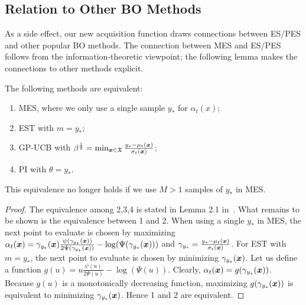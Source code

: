 \subsection{Relation to Other BO Methods}
As a side effect, our new acquisition function draws connections between ES/PES and other popular BO methods. The connection between MES and ES/PES follows from the information-theoretic viewpoint; the following lemma makes the connections to other methods explicit.
%
%
\begin{lem}\label{lem:equivalence}
  The following methods are equivalent:
  \vspace{-5pt}
\begin{enumerate}\setlength{\itemsep}{-1pt}
\item MES, where we only use a single sample $y_*$ for $\alpha_t(x)$;
\item EST with $m = y_*$;
\item GP-UCB with $\beta^{\frac12} = \min_{{\boldsymbol{x}}\in\mathfrak X} \frac{y_*-\mu_{t} ({\boldsymbol{x}})}{\sigma_{t} ({\boldsymbol{x}})}$;
\item PI with $\theta=y_*$.
\end{enumerate}
\end{lem}
This equivalence no longer holds if we use $M>1$ samples of $y_*$ in MES.
\begin{proof}
  The equivalence among 2,3,4 is stated in Lemma 2.1 in~\cite{wang2016est}. What remains to be shown is the equivalence between 1 and 2. When using a single $y_*$ in MES,
  the next point to evaluate is chosen by maximizing $\alpha_t({\boldsymbol{x}}) =\gamma_{y_*}( {\boldsymbol{x}})\frac{\psi(\gamma_{y_*}( {\boldsymbol{x}}))}{2\Psi(\gamma_{y_*}({\boldsymbol{x}}))} - \log(\Psi(\gamma_{y_*}( {\boldsymbol{x}})))$ and $\gamma_{y_*} = \frac{y_* - \mu_t({\boldsymbol{x}})}{\sigma_t({\boldsymbol{x}})}$. For EST with $m=y_*$, the next point to evaluate is chosen by minimizing $\gamma_{y_*}( {\boldsymbol{x}})$. Let us define a function $g(u) = u\frac{\psi(u)}{2\Psi(u)} - \log(\Psi(u))$. Clearly, $\alpha_t({\boldsymbol{x}}) = g(\gamma_{y_*}({\boldsymbol{x}}))$. Because $g(u)$ is a monotonically decreasing function, maximizing $g(\gamma_{y_*}({\boldsymbol{x}}))$ is equivalent to minimizing $\gamma_{y_*}({\boldsymbol{x}})$. Hence 1 and 2 are equivalent.
\end{proof}

%

%



